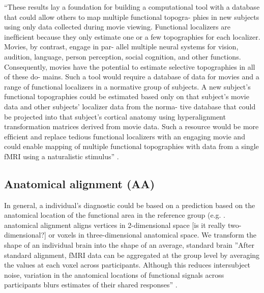 ``These results lay a foundation for building a computational tool with a
database that could allow others to map multiple functional topogra- phies in
new subjects using only data collected during movie viewing. Functional
localizers are inefﬁcient because they only estimate one or a few topographies
for each localizer. Movies, by contrast, engage in par- allel multiple neural
systems for vision, audition, language, person perception, social cognition, and
other functions. Consequently, movies have the potential to estimate selective
topographies in all of these do- mains. Such a tool would require a database of
data for movies and a range of functional localizers in a normative group of
subjects. A new subject’s functional topographies could be estimated based only
on that subject’s movie data and other subjects’ localizer data from the norma-
tive database that could be projected into that subject’s cortical anatomy using
hyperalignment transformation matrices derived from movie data. Such a resource
would be more efﬁcient and replace tedious functional localizers with an
engaging movie and could enable mapping of multiple functional topographies with
data from a single fMRI using a naturalistic stimulus''
\citep{jiahui2020predicting}.

\subsection{Anatomical alignment (AA)}



In general, a individual's diagnostic could be based on a prediction based on
the anatomical location of the functional area in the reference group (e.g.
\citet{weiner2018defining}.
%
anatomical alignment aligns vertices in 2-dimensional space [is it really
two-dimensional?] or voxels in three-dimensional anatomical space.
%
We transform the shape of an individual brain into the shape of an average,
standard brain
%
''After standard alignment, fMRI data can be aggregated at the group level by
averaging the values at each voxel across participants. Although this reduces
intersubject noise, variation in the anatomical locations of functional signals
across participants blurs estimates of their shared responses''
\citep{cohen2017computational}.




